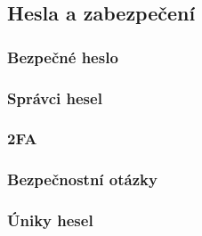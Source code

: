 \subsection{Hesla a zabezpečení}
\subsubsection*{Bezpečné heslo}
\subsubsection*{Správci hesel}
\subsubsection*{2FA}
\subsubsection*{Bezpečnostní otázky}
\subsubsection*{Úniky hesel}
